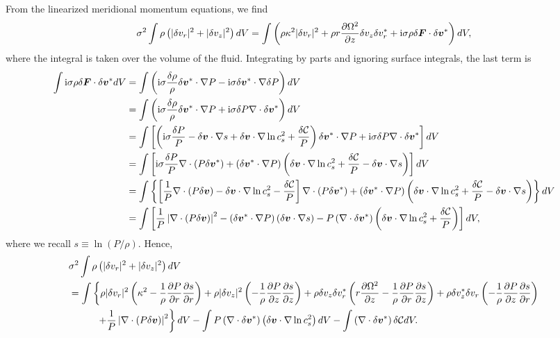 From the linearized meridional momentum equations, we find 
\begin{align}
  \sigma^2\int\rho\left(|\delta v_r|^2 + |\delta v_z|^2\right)dV = \int\left( \rho
  \kappa^2 |\delta v_r|^2 + \rho r\frac{\partial \Omega^2}{\partial z} \delta v_z \delta
  v_r^*  + \mathrm{i}\sigma \rho \delta \bm{F}\cdot\delta\bm{v}^*
  \right)dV,
\end{align}
where the integral is taken over the volume of the fluid. Integrating
by parts and ignoring surface integrals, the last term is
\begin{align}
  \int \mathrm{i}\sigma\rho \delta \bm{F}\cdot\delta\bm{v}^*dV &=\int\left( \mathrm{i}\sigma \frac{\delta
    \rho}{\rho}\delta\bm{v}^*\cdot \nabla P - \mathrm{i}\sigma \delta
  \bm{v}^*\cdot\nabla \delta P  \right)dV\notag\\
&= \int\left( \mathrm{i}\sigma \frac{\delta
    \rho}{\rho}\delta\bm{v}^*\cdot\nabla P + \mathrm{i}\sigma \delta
 P  \nabla\cdot \delta \bm{v}^*  \right)dV\notag\\
 & = \int\left[
   \left(
   \mathrm{i}\sigma \frac{\delta P}{P} - \delta\bm{v}\cdot\nabla s + \delta
   \bm{v} \cdot \nabla \ln{c_s^2} + \frac{\delta\mathcal{C}}{P}
   \right)\delta\bm{v}^*\cdot\nabla P  + \mathrm{i}\sigma \delta
   P  \nabla\cdot \delta \bm{v}^*
   \right]dV\notag\\
 & = \int\left[
   \mathrm{i}\sigma\frac{\delta P}{P}\nabla\cdot\left(P\delta\bm{v}^*\right) +
   \left(\delta\bm{v}^*\cdot\nabla P\right) \left(\delta\bm{v} \cdot \nabla
   \ln{c_s^2} + \frac{\delta\mathcal{C}}{P}   -  \delta\bm{v}\cdot\nabla s\right) 
   \right]dV\notag\\
 & = \int\left\{
   \left[\frac{1}{P}\nabla\cdot\left(P\delta\bm{v}\right) -
   \delta\bm{v}\cdot\nabla\ln{c_s^2} - \frac{\delta\mathcal{C}}{P}  \right]\nabla\cdot\left(P\delta\bm{v}^*\right)
   +\left(\delta\bm{v}^*\cdot\nabla P\right)\left(\delta\bm{v} \cdot \nabla
   \ln{c_s^2} + \frac{\delta\mathcal{C}}{P}   -  \delta\bm{v}\cdot\nabla s \right)
   \right\}dV \notag\\
   &=\int\left[
     \frac{1}{P}\left|\nabla\cdot\left(P\delta\bm{v}\right)\right|^2 -
     \left(\delta\bm{v}^*\cdot\nabla P\right)\left(\delta\bm{v}\cdot\nabla s
     \right) -
     P\left(\nabla\cdot\delta\bm{v}^*\right)\left(\delta\bm{v}\cdot\nabla\ln{c_s^2} + \frac{\delta\mathcal{C}}{P} \right)  
     \right]dV,
\end{align}
where we recall $s\equiv\ln{(P/\rho)}$. Hence,
\begin{align}\label{integral_ex}
  &\sigma^2\int\rho\left(|\delta v_r|^2 + |\delta v_z|^2\right)dV \notag\\
&=  \int\left\{
  \rho |\delta v_r|^2 \left(\kappa^2 - \frac{1}{\rho}\frac{\partial P}{\partial
    r}\frac{\partial s}{\partial r}\right)
  + \rho |\delta v_z|^2\left(-\frac{1}{\rho}\frac{\partial P}{\partial
    z}\frac{\partial s}{\partial z}\right)
   + \rho \delta v_z \delta v_r^*\left(r\frac{\partial\Omega^2}{\partial z} -
  \frac{1}{\rho}\frac{\partial P}{\partial
    r}\frac{\partial s}{\partial z}\right) 
  + \rho \delta v_z^*\delta v_r \left(-\frac{1}{\rho}\frac{\partial P}{\partial
    z}\frac{\partial s}{\partial r}\right)\right. \notag\\
&\phantom{==\int}\left.+
  \frac{1}{P}\left|\nabla\cdot\left(P\delta\bm{v}\right)\right|^2
  \right\}dV -\int
  P\left(\nabla\cdot\delta\bm{v}^*\right)\left(\delta\bm{v}\cdot\nabla\ln{c_s^2}\right)dV
  -\int \left(\nabla\cdot\delta\bm{v}^*\right)\delta\mathcal{C}dV.  
\end{align}
